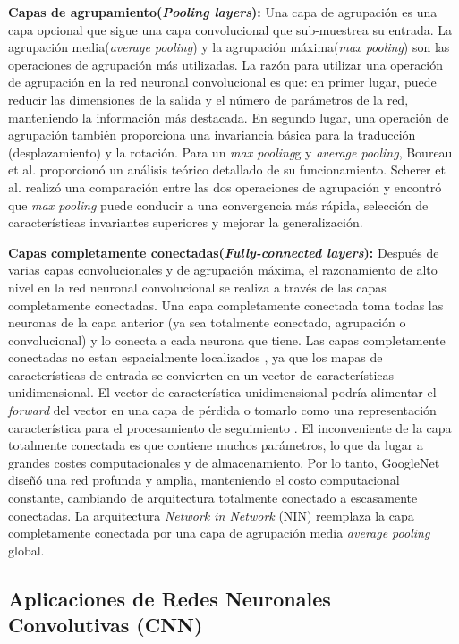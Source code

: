 \textbf{Capas de agrupamiento(\textit{Pooling layers}):} Una capa de agrupación es una capa opcional que sigue una capa convolucional que sub-muestrea su entrada. La agrupación media(\textit{average pooling}) y la agrupación máxima(\textit{max pooling}) son las operaciones de agrupación más utilizadas. La razón para utilizar una operación de agrupación en la red neuronal convolucional es que: en primer lugar, puede reducir las dimensiones de la salida y el número de parámetros de la red, manteniendo la información más destacada. En segundo lugar, una operación de agrupación también proporciona una invariancia básica para la traducción (desplazamiento) y la rotación.  Para un \textit{max pooling}g y \textit{average pooling}, Boureau et al. \cite{Boureau} proporcionó un análisis teórico detallado de su funcionamiento. Scherer et al. \cite{Scherer} realizó una comparación entre las dos operaciones de agrupación y encontró que \textit{max pooling} puede conducir a una convergencia más rápida, selección de características invariantes superiores y mejorar la generalización.

\textbf{Capas completamente conectadas(\textit{Fully-connected layers}):}  Después de varias capas convolucionales y de agrupación máxima, el razonamiento de alto nivel en la red neuronal convolucional se realiza a través de las capas completamente conectadas. Una capa completamente conectada toma todas las neuronas de la capa anterior (ya sea totalmente conectado, agrupación o convolucional) y lo conecta a cada neurona que tiene. Las capas completamente conectadas no estan espacialmente localizados , ya que los mapas de características de entrada se convierten en un vector de características unidimensional. El vector de característica unidimensional podría alimentar el \textit{forward} del vector en una capa de pérdida o tomarlo como una representación característica para el procesamiento de seguimiento \cite{Girshick}. El inconveniente de la capa totalmente conectada es que contiene muchos parámetros, lo que da lugar a grandes costes computacionales y de almacenamiento. Por lo tanto, GoogleNet \cite{Szegedy} diseñó una red profunda y amplia, manteniendo el costo computacional constante, cambiando de arquitectura totalmente conectado a escasamente conectadas. La arquitectura \textit{Network in Network} (NIN) \cite{Lin} reemplaza la capa completamente conectada por una capa de agrupación media \textit{average pooling} global.


\subsection {Aplicaciones de   {Redes Neuronales Convolutivas (CNN)}}

